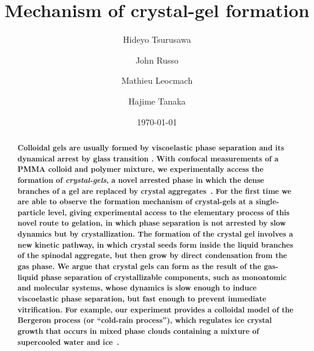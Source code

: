 \documentclass[a4paper,preprint,superscriptaddress]{revtex4}
\begin{document}
\title{Mechanism of crystal-gel formation}
\author{Hideyo Tsurusawa}
\author{John Russo}
\author{Mathieu Leocmach}
\author{Hajime Tanaka}


\date{\today}

\begin{abstract}
{\bf 
Colloidal gels are usually formed by viscoelastic phase separation and its dynamical arrest by glass transition \cite{tanaka1999colloid,tanaka2000viscoelastic,foffi2002,lu2008gelation,zaccarelli2008gelation,testard2011}.
With confocal measurements of a PMMA colloid and polymer mixture, we experimentally access the formation of \emph{crystal-gels}, a novel arrested phase in which the dense branches of a gel are replaced by crystal aggregates~\cite{fortini2008crystallization,perez2011pathways,sabin2012}. 
For the first time we are able to observe the formation mechanism of crystal-gels at a single-particle level, giving experimental access to the elementary process of this novel route to gelation, in which phase separation is not arrested by slow dynamics but by crystallization.
The formation of the crystal gel  involves a new kinetic pathway, in which crystal seeds form inside the liquid branches of the spinodal aggregate, but then grow by direct condensation from the gas phase.
We argue that crystal gels can form as the result of the gas-liquid phase separation of crystallizable components, such as monoatomic and molecular systems, whose dynamics is slow enough to induce viscoelastic phase separation, but fast enough to prevent immediate vitrification.
For example, our experiment provides a colloidal model of the Bergeron process (or ``cold-rain process''), which regulates ice crystal growth that occurs in mixed phase clouds containing a mixture of supercooled water and ice~\cite{glickman2000glossary}.
}
\end{abstract}
 
\end{document}
